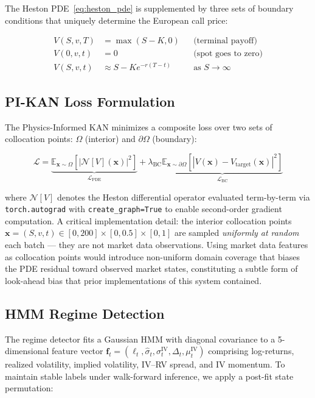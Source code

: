 \documentclass[11pt,a4paper]{article}
\begin{document}
The Heston PDE~\eqref{eq:heston_pde} is supplemented by three sets of boundary conditions that uniquely determine the European call price:

\begin{align}
V(S, v, T) &= \max(S - K, 0) & &\text{(terminal payoff)} \label{eq:bc_terminal}\\
V(0, v, t) &= 0 & &\text{(spot goes to zero)} \label{eq:bc_zero}\\
V(S, v, t) &\approx S - Ke^{-r(T-t)} & &\text{as } S \to \infty \label{eq:bc_inf}
\end{align}

\subsection{PI-KAN Loss Formulation}

The Physics-Informed KAN minimizes a composite loss over two sets of collocation points: $\Omega$ (interior) and $\partial\Omega$ (boundary):

\begin{equation}
\mathcal{L} = \underbrace{\mathbb{E}_{\bm{x} \sim \Omega} \!\left[\left|\mathcal{N}[V](\bm{x})\right|^2\right]}_{\mathcal{L}_\text{PDE}} + \lambda_{\text{BC}} \underbrace{\mathbb{E}_{\bm{x} \sim \partial\Omega} \!\left[\left|V(\bm{x}) - V_\text{target}(\bm{x})\right|^2\right]}_{\mathcal{L}_\text{BC}}
\label{eq:loss}
\end{equation}

where $\mathcal{N}[V]$ denotes the Heston differential operator evaluated term-by-term via \texttt{torch.autograd} with \texttt{create\_graph=True} to enable second-order gradient computation. A critical implementation detail: the interior collocation points $\bm{x} = (S, v, t) \in [0, 200] \times [0, 0.5] \times [0, 1]$ are sampled \emph{uniformly at random} each batch — they are not market data observations. Using market data features as collocation points would introduce non-uniform domain coverage that biases the PDE residual toward observed market states, constituting a subtle form of look-ahead bias that prior implementations of this system contained.

\subsection{HMM Regime Detection}

The regime detector fits a Gaussian HMM with diagonal covariance to a 5-dimensional feature vector $\bm{f}_t = (\ell_t, \hat{\sigma}_t, \sigma^\text{IV}_t, \Delta_t, \mu^\text{IV}_t)$ comprising log-returns, realized volatility, implied volatility, IV--RV spread, and IV momentum. To maintain stable labels under walk-forward inference, we apply a post-fit state permutation:
\end{document}
